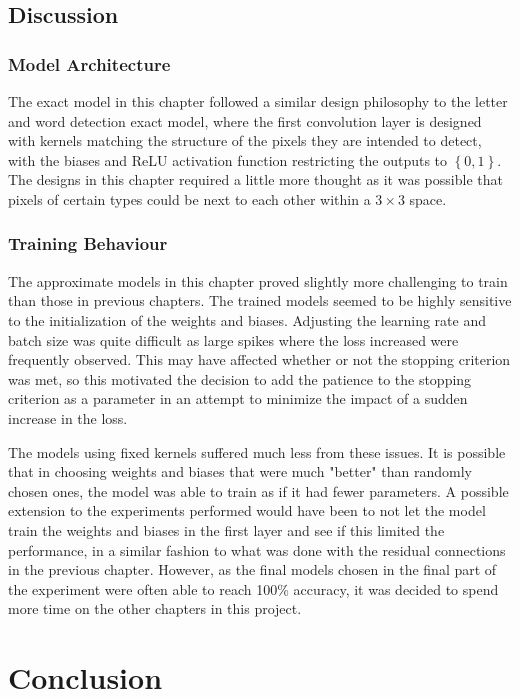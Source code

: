 \documentclass{somasmsc}
\begin{document}
\section{Discussion}

\subsection{Model Architecture}

The exact model in this chapter followed a similar design philosophy to the letter and word detection exact model, where the first convolution layer is designed with kernels matching the structure of the pixels they are intended to detect, with the biases and ReLU activation function restricting the outputs to $\left\{0,1\right\}$. The designs in this chapter required a little more thought as it was possible that pixels of certain types could be next to each other within a $3 \times 3$ space.

\subsection{Training Behaviour}

The approximate models in this chapter proved slightly more challenging to train than those in previous chapters. The trained models seemed to be highly sensitive to the initialization of the weights and biases. Adjusting the learning rate and batch size was quite difficult as large spikes where the loss increased were frequently observed. This may have affected whether or not the stopping criterion was met, so this motivated the decision to add the patience to the stopping criterion as a parameter in an attempt to minimize the impact of a sudden increase in the loss.

The models using fixed kernels suffered much less from these issues. It is possible that in choosing weights and biases that were much "better" than randomly chosen ones, the model was able to train as if it had fewer parameters. A possible extension to the experiments performed would have been to not let the model train the weights and biases in the first layer and see if this limited the performance, in a similar fashion to what was done with the residual connections in the previous chapter. However, as the final models chosen in the final part of the experiment were often able to reach 100\% accuracy, it was decided to spend more time on the other chapters in this project.


\chapter{Conclusion}
\end{document}

